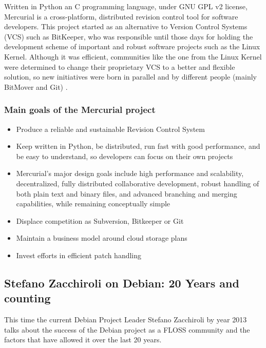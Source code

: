 \documentclass[11pt]{article} %
\begin{document}
Written in Python an C programming language, under GNU GPL v2 license, Mercurial is a cross-platform, distributed revision control tool for software developers. This project started as an alternative to Version Control Systems (VCS) such as BitKeeper, who was responsible until those days for holding the development scheme of important and robust software projects such as the Linux Kernel. Although it was efficient, communities like the one from the Linux Kernel were determined to change their proprietary VCS to a better and flexible solution, so new initiatives were born in parallel and by different people (mainly BitMover and Git) \cite{Mackall:2006mm}.

\subsubsection{Main goals of the Mercurial project}

  	\begin{itemize}
  	  \item Produce a reliable and sustainable Revision Control System
  	  \item Keep written in Python, be distributed, run fast with good performance, and be easy to understand, so developers can focus on their own projects
  	  \item Mercurial's major design goals include high performance and scalability, decentralized, fully distributed collaborative development, robust handling of both plain text and binary files, and advanced branching and merging capabilities, while remaining conceptually simple
  	  \item Displace competition as Subversion, Bitkeeper or Git
  	  \item Maintain a business model around cloud storage plans
  	  \item Invest efforts in efficient patch handling
  	\end{itemize}

\subsection{Stefano Zacchiroli on Debian: 20 Years and counting}

This time the current Debian Project Leader Stefano Zacchiroli by year 2013 talks about the success of the Debian project as a FLOSS community and the factors that have allowed it over the last 20 years.
\end{document}
